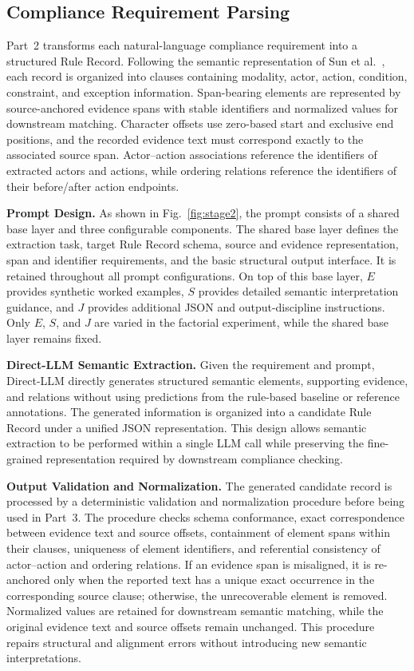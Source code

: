 \documentclass[conference]{IEEEtran}
\begin{document}
\subsection{Compliance Requirement Parsing}
\label{sec:4.2}

Part~2 transforms each natural-language compliance requirement into a structured Rule Record. Following the semantic representation of Sun et al.~\cite{sun2024design}, each record is organized into clauses containing modality, actor, action, condition, constraint, and exception information. Span-bearing elements are represented by source-anchored evidence spans with stable identifiers and normalized values for downstream matching. Character offsets use zero-based start and exclusive end positions, and the recorded evidence text must correspond exactly to the associated source span. Actor--action associations reference the identifiers of extracted actors and actions, while ordering relations reference the identifiers of their before/after action endpoints.

\textbf{Prompt Design.} As shown in Fig.~\ref{fig:stage2}, the prompt consists of a shared base layer and three configurable components. The shared base layer defines the extraction task, target Rule Record schema, source and evidence representation, span and identifier requirements, and the basic structural output interface. It is retained throughout all prompt configurations. On top of this base layer, \(E\) provides synthetic worked examples, \(S\) provides detailed semantic interpretation guidance, and \(J\) provides additional JSON and output-discipline instructions. Only \(E\), \(S\), and \(J\) are varied in the factorial experiment, while the shared base layer remains fixed.

\textbf{Direct-LLM Semantic Extraction.} Given the requirement and prompt, Direct-LLM directly generates structured semantic elements, supporting evidence, and relations without using predictions from the rule-based baseline or reference annotations. The generated information is organized into a candidate Rule Record under a unified JSON representation. This design allows semantic extraction to be performed within a single LLM call while preserving the fine-grained representation required by downstream compliance checking.

\textbf{Output Validation and Normalization.} The generated candidate record is processed by a deterministic validation and normalization procedure before being used in Part~3. The procedure checks schema conformance, exact correspondence between evidence text and source offsets, containment of element spans within their clauses, uniqueness of element identifiers, and referential consistency of actor--action and ordering relations. If an evidence span is misaligned, it is re-anchored only when the reported text has a unique exact occurrence in the corresponding source clause; otherwise, the unrecoverable element is removed. Normalized values are retained for downstream semantic matching, while the original evidence text and source offsets remain unchanged. This procedure repairs structural and alignment errors without introducing new semantic interpretations.
\end{document}
